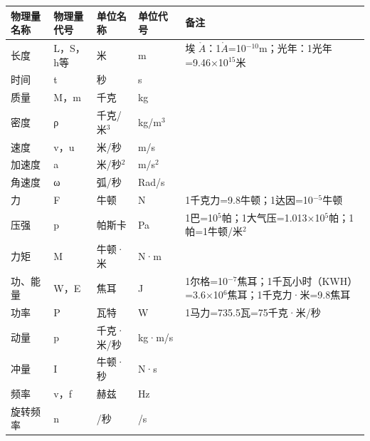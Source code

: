 {\def\LTcaptype{none} %
\begin{longtable}[]{@{}
  >{\raggedright\arraybackslash}p{}
  >{\raggedright\arraybackslash}p{}
  >{\raggedright\arraybackslash}p{}
  >{\raggedright\arraybackslash}p{}
  >{\raggedright\arraybackslash}p{}@{}}
\toprule\noalign{}
\begin{minipage}[b]{\linewidth}\raggedright
物理量名称
\end{minipage} & \begin{minipage}[b]{\linewidth}\raggedright
物理量代号
\end{minipage} & \begin{minipage}[b]{\linewidth}\raggedright
单位名称
\end{minipage} & \begin{minipage}[b]{\linewidth}\raggedright
单位代号
\end{minipage} & \begin{minipage}[b]{\linewidth}\raggedright
备注
\end{minipage} \\
\midrule\noalign{}
\endhead
\bottomrule\noalign{}
\endlastfoot
长度 & L，S，h等 & 米 & m & 埃
\(\mathring{A}\)：1\(\mathring{A}\)=10\(^{-10}\)m；光年：1光年=9.46×10\(^{15}\)米 \\
时间 & t & 秒 & s & \\
质量 & M，m & 千克 & kg & \\
密度 & ρ & 千克/米\(^{3}\) & kg/m\(^{3}\) & \\
速度 & v，u & 米/秒 & m/s & \\
加速度 & a & 米/秒\(^{2}\) & m/s\(^{2}\) & \\
角速度 & ω & 弧/秒 & Rad/s & \\
力 & F & 牛顿 & N & 1千克力=9.8牛顿；1达因=10\(^{-5}\)牛顿 \\
压强 & p & 帕斯卡 & Pa &
1巴=10\(^{5}\)帕；1大气压=1.013×10\(^{5}\)帕；1帕=1牛顿/米\(^{2}\) \\
力矩 & M & 牛顿·米 & N·m & \\
功、能量 & W，E & 焦耳 & J &
1尔格=10\(^{-7}\)焦耳；1千瓦小时（KWH）=3.6×10\(^{6}\)焦耳；1千克力·米=9.8焦耳 \\
功率 & P & 瓦特 & W & 1马力=735.5瓦=75千克·米/秒 \\
动量 & p & 千克·米/秒 & kg·m/s & \\
冲量 & I & 牛顿·秒 & N·s & \\
频率 & v，f & 赫兹 & Hz & \\
旋转频率 & n & 1/秒 & 1/s & \\
\end{longtable}
}

